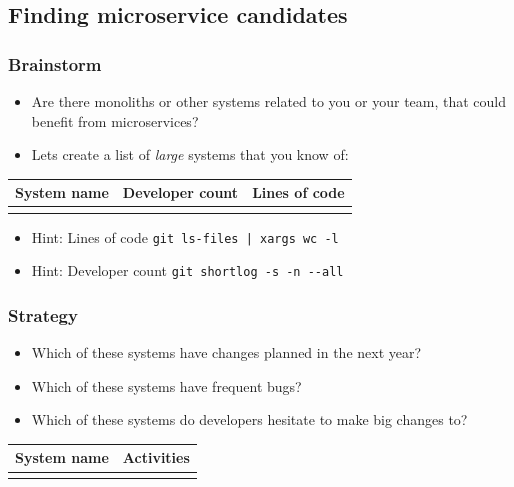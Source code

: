 \documentclass[8pt]{article}
\begin{document}
\subsection{Finding microservice candidates}
\label{sec:orgb5fff0a}
\subsubsection{Brainstorm}
\label{sec:org7cdd4ca}
\begin{itemize}
\item Are there monoliths or other systems related to you or your team, that could benefit from microservices?

\item Lets create a list of \emph{large} systems that you know of:
\end{itemize}
\begin{center}
\begin{tabular}{lll}
\hline
System name & Developer count & Lines of code\\
\hline
 &  & \\
\hline
\end{tabular}
\end{center}

\begin{itemize}
\item Hint: Lines of code
\texttt{git ls-files | xargs wc -l}

\item Hint: Developer count
\texttt{git shortlog -s -n -{}-all}
\end{itemize}

\subsubsection{Strategy}
\label{sec:orgd2c76b9}
\begin{itemize}
\item Which of these systems have changes planned in the next year?
\item Which of these systems have frequent bugs?
\item Which of these systems do developers hesitate to make big changes to?
\end{itemize}

\begin{center}
\begin{tabular}{ll}
\hline
System name & Activities\\
\hline
 & \\
\hline
\end{tabular}
\end{center}
\end{document}
